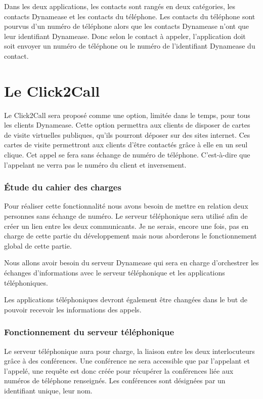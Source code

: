 Dans les deux applications, les contacts sont rangés en deux catégories, les contacts Dynamease et les contacts du téléphone. Les contacts du téléphone sont pourvus d'un numéro de téléphone alors que les contacts Dynamease n'ont que leur identifiant Dynamease. Donc selon le contact à appeler, l'application doit soit envoyer un numéro de téléphone ou le numéro de l'identifiant Dynamease du contact.

\section{Le Click2Call}

Le Click2Call sera proposé comme une option, limitée dans le temps, pour tous les clients Dynamease. Cette option permettra aux clients de disposer de cartes de visite virtuelles publiques, qu'ils pourront déposer sur des sites internet. Ces cartes de visite permettront aux clients d'être contactés grâce à elle en un seul clique. Cet appel se fera sans échange de numéro de téléphone. C'est-à-dire que l'appelant ne verra pas le numéro du client et inversement.

\subsubsection{Étude du cahier des charges}

Pour réaliser cette fonctionnalité nous avons besoin de mettre en relation deux personnes sans échange de numéro. Le serveur téléphonique sera utilisé afin de créer un lien entre les deux communicants. Je ne serais, encore une fois, pas en charge de cette partie du développement mais nous aborderons le fonctionnement global de cette partie.

Nous allons avoir besoin du serveur Dynamease qui sera en charge d'orchestrer les échanges d'informations avec le serveur téléphonique et les applications téléphoniques.

Les applications téléphoniques devront également être changées dans le but de pouvoir recevoir les informations des appels.

\subsubsection{Fonctionnement du serveur téléphonique}

Le serveur téléphonique aura pour charge, la liaison entre les deux interlocuteurs grâce à des conférences. Une conférence ne sera accessible que par l'appelant et l'appelé, une requête est donc créée pour récupérer la conférences liée aux numéros de téléphone renseignés. Les conférences sont désignées par un identifiant unique, leur nom.

